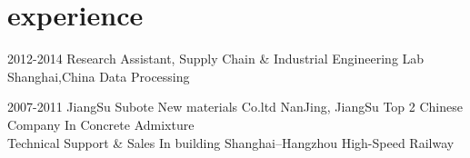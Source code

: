 \documentclass[]{friggeri-cv} %
\begin{document}

\section{experience}

\begin{entrylist}

\entry
{2012-2014}
{Research Assistant, Supply Chain \& Industrial Engineering Lab}
{Shanghai,China}
{Data Processing}




\entry
{2007-2011}
{JiangSu Subote New materials Co.ltd}
{NanJing, JiangSu}
{Top 2 Chinese Company In Concrete Admixture\\
Technical Support \& Sales In building Shanghai–Hangzhou High-Speed Railway 
}
\end{entrylist}
\end{document}
